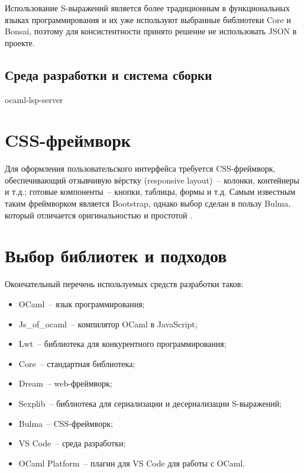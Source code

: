 Использование S-выражений является более традиционным в функциональных языках программирования и их
уже используют выбранные библиотеки Core и Bonsai, поэтому для консистентности принято решение
не использовать JSON в проекте.

\subsection{Среда разработки и система сборки}

ocaml-lsp-server

\section{CSS-фреймворк}

Для оформления пользовательского интерфейса требуется CSS-фреймворк, обеспечивающий
отзывчивую вёрстку (responsive layout)~-- колонки, контейнеры и т.д.;
готовые компоненты~-- кнопки, таблицы, формы и т.д. Самым известным таким фреймворком является Bootstrap,
однако выбор сделан в пользу Bulma, который отличается оригинальностью и простотой \cite{bulma-vs-bootstrap}.

\section{Выбор библиотек и подходов}

Окончательный перечень используемых средств разработки таков:

\begin{itemize}
      \item OCaml~-- язык программирования;
      \item Js\_of\_ocaml~-- компилятор OCaml в JavaScript;
      \item Lwt~-- библиотека для конкурентного программирования;
      \item Core~-- стандартная библиотека;
      \item Dream~-- web-фреймворк;
      \item Sexplib~-- библиотека для сериализации и десериализации S-выражений;
      \item Bulma~-- CSS-фреймворк;
      \item VS Code~-- среда разработки;
      \item OCaml Platform~-- плагин для VS Code для работы с OCaml.
\end{itemize}
